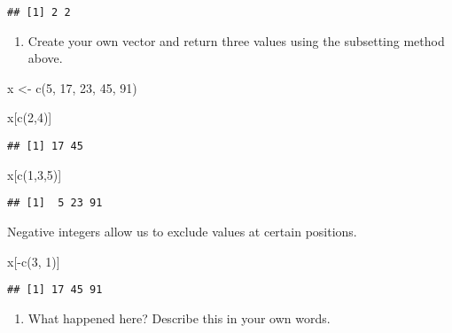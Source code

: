 \documentclass[
]{article}
\newenvironment{Shaded}{\begin{snugshade}}{\end{snugshade}}
\newcommand{\DecValTok}[1]{\textcolor[rgb]{0.00,0.00,0.81}{#1}}
\newcommand{\FunctionTok}[1]{\textcolor[rgb]{0.00,0.00,0.00}{#1}}
\newcommand{\NormalTok}[1]{#1}
\newcommand{\OtherTok}[1]{\textcolor[rgb]{0.56,0.35,0.01}{#1}}
\newcommand{\SpecialCharTok}[1]{\textcolor[rgb]{0.00,0.00,0.00}{#1}}
\providecommand{\tightlist}{%
  \setlength{\itemsep}{0pt}\setlength{\parskip}{0pt}}
\begin{document}
\begin{verbatim}
## [1] 2 2
\end{verbatim}

\begin{enumerate}
\def\labelenumi{(\arabic{enumi})}
\tightlist
\item
  Create your own vector and return three values using the subsetting
  method above.
\end{enumerate}

\begin{Shaded}
\begin{Highlighting}[]
\NormalTok{x }\OtherTok{\textless{}{-}} \FunctionTok{c}\NormalTok{(}\DecValTok{5}\NormalTok{, }\DecValTok{17}\NormalTok{, }\DecValTok{23}\NormalTok{, }\DecValTok{45}\NormalTok{, }\DecValTok{91}\NormalTok{)}

\NormalTok{x[}\FunctionTok{c}\NormalTok{(}\DecValTok{2}\NormalTok{,}\DecValTok{4}\NormalTok{)]}
\end{Highlighting}
\end{Shaded}

\begin{verbatim}
## [1] 17 45
\end{verbatim}

\begin{Shaded}
\begin{Highlighting}[]
\NormalTok{x[}\FunctionTok{c}\NormalTok{(}\DecValTok{1}\NormalTok{,}\DecValTok{3}\NormalTok{,}\DecValTok{5}\NormalTok{)]}
\end{Highlighting}
\end{Shaded}

\begin{verbatim}
## [1]  5 23 91
\end{verbatim}

Negative integers allow us to exclude values at certain positions.

\begin{Shaded}
\begin{Highlighting}[]
\NormalTok{x[}\SpecialCharTok{{-}}\FunctionTok{c}\NormalTok{(}\DecValTok{3}\NormalTok{, }\DecValTok{1}\NormalTok{)]}
\end{Highlighting}
\end{Shaded}

\begin{verbatim}
## [1] 17 45 91
\end{verbatim}

\begin{enumerate}
\def\labelenumi{(\arabic{enumi})}
\setcounter{enumi}{1}
\tightlist
\item
  What happened here? Describe this in your own words.
\end{enumerate}
\end{document}
